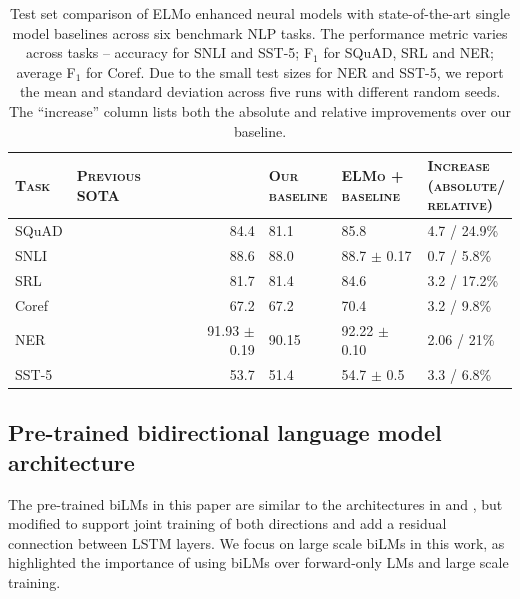 \documentclass[11pt,a4paper]{article}
\newcommand{\ELMO}{ELMo}
\begin{document}
\begin{table}   
\centering
\begin{tabular}{l|lr||p{8ex}p{12ex}p{11ex}}
\textsc{\textbf{Task}}  & \textsc{\textbf{Previous SOTA}} & & \parbox{6ex}{\textsc{\textbf{Our \\ baseline}}} & \parbox{9ex}{\textsc{\textbf{\ELMO{} + \\ baseline}}} & \parbox{11ex}{\textsc{\textbf{Increase \\ (absolute/\\ relative)}}} \\ \hline \hline
SQuAD  &  \citet{liu2017stochastic}  & 84.4 & 81.1 & 85.8 & 4.7 / 24.9\% \\
SNLI   &  \citet{Chen2017EnhancedLF}  & 88.6 & 88.0  & 88.7 $\pm$ 0.17 & 0.7 / 5.8\% \\
SRL    &  \citet{He2017DeepSR} &  81.7  & 81.4  & 84.6 & 3.2 / 17.2\% \\
Coref  &  \citet{Lee2017EndtoendNC} & 67.2 & 67.2 & 70.4 & 3.2 / 9.8\%\\
NER    &  \citet{Peters2017SemisupervisedST} & 91.93 $\pm$ 0.19 & 90.15 & 92.22 $\pm$ 0.10 & 2.06 / 21\% \\
SST-5  & \citet{McCann2017LearnedIT} & 53.7 & 51.4 & 54.7 $\pm$ 0.5 & 3.3 / 6.8\%
\end{tabular}
\caption{Test set comparison of \ELMO{} enhanced neural models with state-of-the-art single model baselines across six benchmark NLP tasks.
The performance metric varies across tasks -- accuracy for SNLI and SST-5; F$_1$ for SQuAD, SRL and NER; average F$_1$ for Coref.
Due to the small test sizes for NER and SST-5, we report the mean and standard deviation across five runs with different random seeds.
The ``increase'' column lists both the absolute and relative improvements over our baseline.}
\label{table:overall}
\end{table}  

\subsection{Pre-trained bidirectional language model architecture}
\label{sec:pretrainedLMs}

The pre-trained biLMs in this paper are similar to the architectures in \citet{Jzefowicz2016ExploringTL} and \citet{kim2015characterNeuralLM}, but 
modified to support joint training of both directions and add a residual connection between LSTM layers.
We focus on large scale biLMs in this work, as \citet{Peters2017SemisupervisedST} highlighted the importance of using biLMs over forward-only LMs and large scale training.
\end{document}
